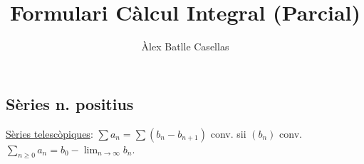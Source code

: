\documentclass[10pt,a4paper,landscape]{article}
\title{Formulari Càlcul Integral (Parcial)}
\author{Àlex Batlle Casellas}
\begin{document}
 
\begin{multicols}{4}
\section{Sèries n. positius}
\underline{Sèries telescòpiques}: $\sum a_n=\sum(b_n-b_{n+1})$ conv. sii $(b_n)$ conv. $\sum_{n\geq0}a_n=b_0-\lim_{n\rightarrow\infty}b_n$.

 
\end{multicols}
\end{document}
